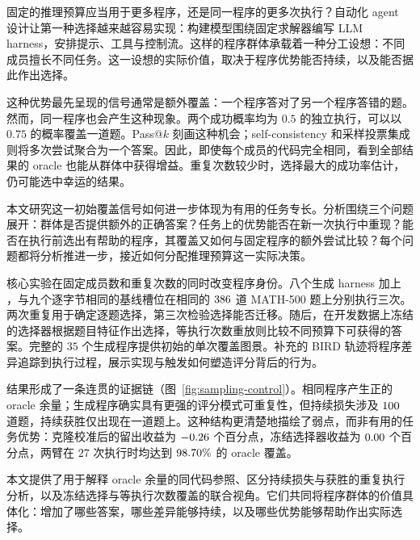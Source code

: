 固定的推理预算应当用于更多程序，还是同一程序的更多次执行？自动化 agent 设计让第一种选择越来越容易实现：构建模型围绕固定求解器编写 LLM harness，安排提示、工具与控制流\citep{adas2024,tthe2026,selfharness2026}。这样的程序群体承载着一种分工设想：不同成员擅长不同任务。这一设想的实际价值，取决于程序优势能否持续，以及能否据此作出选择。

这种优势最先呈现的信号通常是额外覆盖：一个程序答对了另一个程序答错的题。然而，同一程序也会产生这种现象。两个成功概率均为 $0.5$ 的独立执行，可以以 $0.75$ 的概率覆盖一道题。Pass@$k$ 刻画这种机会；self-consistency 和采样投票集成则将多次尝试聚合为一个答案\citep{chen2021codex,selfconsistency2022,moreagents2024}。因此，即使每个成员的代码完全相同，看到全部结果的 oracle 也能从群体中获得增益。重复次数较少时，选择最大的成功率估计，仍可能选中幸运的结果。



本文研究这一初始覆盖信号如何进一步体现为有用的任务专长。分析围绕三个问题展开：群体是否提供额外的正确答案？任务上的优势能否在新一次执行中重现？能否在执行前选出有帮助的程序，其覆盖又如何与固定程序的额外尝试比较？每个问题都将分析推进一步，接近如何分配推理预算这一实际决策。

核心实验在固定成员数和重复次数的同时改变程序身份。八个生成 harness 加上 \bare{}，与九个逐字节相同的基线槽位在相同的 $386$ 道 MATH-500 题上分别执行三次。两次重复用于确定逐题选择，第三次检验选择能否迁移。随后，在开发数据上冻结的选择器根据题目特征作出选择，等执行次数重放则比较不同预算下可获得的答案。完整的 $35$ 个生成程序提供初始的单次覆盖图景。补充的 BIRD 轨迹将程序差异追踪到执行过程，展示实现与触发如何塑造评分背后的行为。

结果形成了一条连贯的证据链（图~\ref{fig:sampling-control}）。相同程序产生正的 oracle 余量；生成程序确实具有更强的评分模式可重复性，但持续损失涉及 $100$ 道题，持续获胜仅出现在一道题上。这种结构更清楚地描绘了弱点，而非有用的任务优势：克隆校准后的留出收益为 $-0.26$ 个百分点，冻结选择器收益为 $0.00$ 个百分点，两臂在 $27$ 次执行时均达到 $98.70\%$ 的 oracle 覆盖。

本文提供了用于解释 oracle 余量的同代码参照、区分持续损失与获胜的重复执行分析，以及冻结选择与等执行次数覆盖的联合视角。它们共同将程序群体的价值具体化：增加了哪些答案，哪些差异能够持续，以及哪些优势能够帮助作出实际选择。

